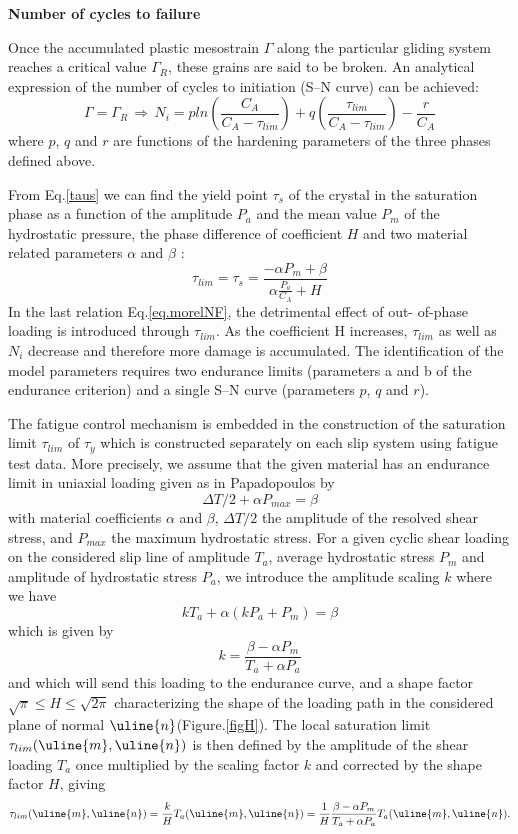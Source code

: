 \textbf{Number of cycles to failure}

Once the accumulated plastic mesostrain $\Gamma$ along the particular gliding system reaches a critical value $\Gamma_R$, these grains are said to be broken. An analytical expression of the number
of cycles to initiation (S–N curve) can be achieved:
\begin{equation}
\Gamma=\Gamma_R \, \Rightarrow \, N_i=pln\left(\frac{C_A}{C_A-\tau_{lim}}\right)+q\left(\frac{\tau_{lim}}{C_A-\tau_{lim}}\right)-\frac{r}{C_A}
\label{eq.morelNF}
\end{equation}
where $p$, $q$ and $r$ are functions of the hardening parameters of the three phases defined above.

From Eq.\eqref{taus} we can find the yield point $\tau_s$ of the crystal in the saturation phase as a function of the amplitude $P_a$ and the mean value $P_m$ of the hydrostatic pressure, the phase difference of coefficient $H$ and two material related parameters $\alpha$ and $\beta$ :
\begin{equation}
\tau_{lim}=\tau_s=\frac{-\alpha P_m+\beta}{\alpha\frac{P_a}{C_A}+H}
\label{taus}
\end{equation}
In the last relation Eq.\ref{eq.morelNF}, the detrimental effect of out-
of-phase loading is introduced through $\tau_{lim}$. As the coefficient H increases, $\tau_{lim}$ as well as $N_i$ decrease and therefore more damage is accumulated. The identification of
the model parameters requires two endurance limits
(parameters a and b of the endurance criterion) and a
single S–N curve (parameters $p$, $q$ and $r$).

The fatigue control mechanism is embedded in the construction of the saturation limit $\tau_{lim}$ of $\tau_y$ which is constructed separately on each slip system using fatigue test data. More precisely, we assume that the given material has an endurance limit in uniaxial loading given as in Papadopoulos by
$$\Delta T/2+\alpha P_{max}=\beta$$
with material coefficients $\alpha$ and $\beta$, $\Delta T/2$ the amplitude of the resolved shear stress, and $P_{max}$ the maximum hydrostatic stress. For a given cyclic shear loading on the considered slip line of amplitude $T_a$, average hydrostatic stress $P_m$ and amplitude of hydrostatic stress $P_a$, we introduce the amplitude scaling $k$ where we have
$$kT_a+\alpha\left( kP_a+P_m\right)=\beta  $$
which is given by
 $$ k=\dfrac{\beta-\alpha P_m}{T_a+\alpha P_a}$$ 
 and which will send this loading to the endurance curve, and a shape factor $\sqrt{\pi}\leqslant H\leqslant \sqrt{2\pi}$ characterizing the shape of the loading path in the considered plane of normal $\uline{n}$(Figure.\ref{figH}). The local saturation limit $\tau_{lim}(\uline{m},\uline{n})$ is then defined by the amplitude of the shear loading $T_a$ once multiplied by the scaling factor $k$ and corrected by the shape factor $H$, giving
$$\tau_{lim}(\uline{m},\uline{n})=\frac{k}{H}T_a(\uline{m},\uline{n})=\frac{1}{H}\frac{\beta-\alpha P_m}{T_a+\alpha P_a}T_a(\uline{m},\uline{n}).$$

